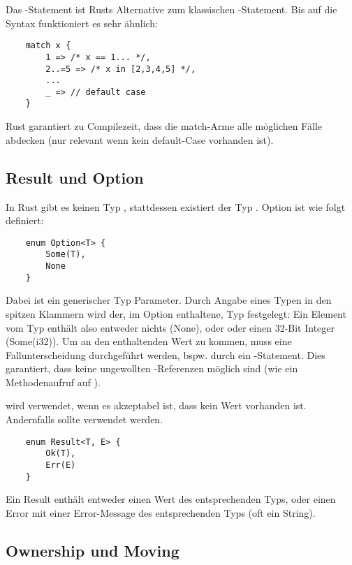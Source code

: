 Das -Statement ist Rusts Alternative zum klassischen -Statement. Bis auf die Syntax funktioniert es sehr ähnlich:

\begin{verbatim}
    match x {
        1 => /* x == 1... */,
        2..=5 => /* x in [2,3,4,5] */,
        ...
        _ => // default case
    }
\end{verbatim}

Rust garantiert zu Compilezeit, dass die match-Arme alle möglichen Fälle abdecken (nur relevant wenn kein default-Case vorhanden ist).

\subsection{Result und Option}

In Rust gibt es keinen Typ , stattdessen existiert der Typ . Option ist wie folgt definiert:

\begin{verbatim}
    enum Option<T> {
        Some(T),
        None
    }
\end{verbatim}

Dabei ist  ein generischer Typ Parameter. Durch Angabe eines Typen in den spitzen Klammern wird der, im Option enthaltene, Typ festgelegt:
Ein Element vom Typ  enthält also entweder nichts (None), oder oder einen 32-Bit Integer (Some(i32)). Um an den enthaltenden Wert zu kommen, muss eine Fallunterscheidung durchgeführt werden, bspw. durch ein -Statement. Dies garantiert, dass keine ungewollten -Referenzen möglich sind (wie \zB ein Methodenaufruf auf ).

 wird verwendet, wenn es akzeptabel ist, dass kein Wert vorhanden ist. Andernfalls sollte  verwendet werden.

\begin{verbatim}
    enum Result<T, E> {
        Ok(T),
        Err(E)
    }
\end{verbatim}

Ein Result enthält entweder einen Wert des entsprechenden Typs, oder einen Error mit einer Error-Message des entsprechenden Typs (oft ein String).

\subsection{Ownership und Moving}

